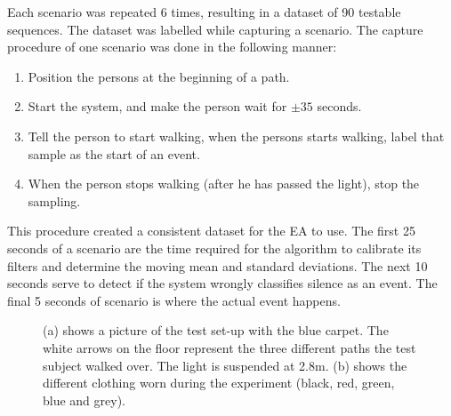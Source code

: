 Each scenario was repeated 6 times, resulting in a dataset of 90 testable sequences. The dataset was labelled while capturing a scenario. The capture procedure of one scenario was done in the following manner:
\begin{enumerate}[itemsep=-1ex,topsep=0pt]
	\item Position the persons at the beginning of a path.
	\item Start the system, and make the person wait for $\pm35$ seconds.
	\item Tell the person to start walking, when the persons starts walking, label that sample as the start of an event.
	\item When the person stops walking (after he has passed the light), stop the sampling.
\end{enumerate}
This procedure created a consistent dataset for the EA to use. The first 25 seconds of a scenario are the time required for the algorithm to calibrate its filters and determine the moving mean and standard deviations. The next 10 seconds serve to detect if the system wrongly classifies silence as an event. The final 5 seconds of scenario is where the actual event happens.

\begin{figure}
	\centering     %
	\label{fig:TestPicture}
	\caption{(a) shows a picture of the test set-up with the blue carpet. The white arrows on the floor represent the three different paths the test subject walked over. The light is suspended at 2.8m. (b) shows the different clothing worn during the experiment (black, red, green, blue and grey).\label{fig:Testsetup}}
\end{figure}

